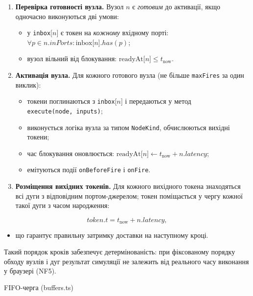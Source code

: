 \begin{enumerate}
\def\labelenumi{\arabic{enumi}.}
\setcounter{enumi}{1}
\item
  \textbf{Перевірка готовності вузла.} Вузол \(n\) є \emph{готовим} до
  активації, якщо одночасно виконуються дві умови:

  \begin{itemize}
  \item
    у \texttt{inbox}\(\lbrack n\rbrack\) є токен на \emph{кожному}
    вхідному порті:
    \(\forall p \in n.inPorts:\text{inbox}\lbrack n\rbrack.has(p)\);
  \item
    вузол вільний від блокування:
    \(\text{readyAt}\lbrack n\rbrack \leq t_{\text{now}}\).
  \end{itemize}
\item
  \textbf{Активація вузла.} Для кожного готового вузла (не більше
  \texttt{maxFires} за один виклик):

  \begin{itemize}
  \item
    токени поглинаються з \texttt{inbox}\(\lbrack n\rbrack\) і
    передаються у метод \texttt{execute(node,\ inputs)};
  \item
    виконується логіка вузла за типом \texttt{NodeKind}, обчислюються
    вихідні токени;
  \item
    час блокування оновлюється:
    \(\text{readyAt}\lbrack n\rbrack \leftarrow t_{\text{now}} + n.latency\);
  \item
    емітуються події \texttt{onBeforeFire} і \texttt{onFire}.
  \end{itemize}
\item
  \textbf{Розміщення вихідних токенів.} Для кожного вихідного токена
  знаходяться всі дуги з відповідним портом-джерелом; токен поміщається
  у чергу кожної такої дуги з часом народження:
\end{enumerate}

\[token.t = t_{\text{now}} + n.latency,\]

\begin{itemize}
\item
  що гарантує правильну затримку доставки на наступному кроці.
\end{itemize}

Такий порядок кроків забезпечує детермінованість: при фіксованому
порядку обходу вузлів і дуг результат симуляції не залежить від
реального часу виконання у браузері (NF5).

FIFO-черга (buffers.ts)


